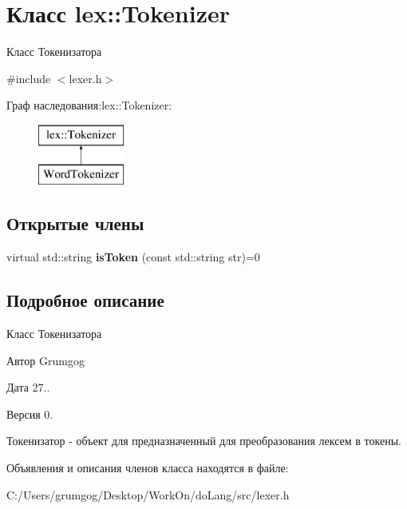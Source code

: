 \hypertarget{classlex_1_1_tokenizer}{}\section{Класс lex\+:\+:Tokenizer}
\label{classlex_1_1_tokenizer}


Класс Токенизатора  




{\ttfamily \#include $<$lexer.\+h$>$}

Граф наследования\+:lex\+:\+:Tokenizer\+:\begin{figure}[H]
\begin{center}
\leavevmode
\includegraphics[height=2.000000cm]{classlex_1_1_tokenizer}
\end{center}
\end{figure}
\subsection*{Открытые члены}
\begin{DoxyCompactItemize}
\item 
\mbox{\label{classlex_1_1_tokenizer_ae074fb2d8d0a4cfc11661c67faad1602}} 
virtual std\+::string {\bfseries is\+Token} (const std\+::string str)=0
\end{DoxyCompactItemize}


\subsection{Подробное описание}
Класс Токенизатора 

\begin{DoxyAuthor}{Автор}
Grumgog 
\end{DoxyAuthor}
\begin{DoxyDate}{Дата}
27.. 
\end{DoxyDate}
\begin{DoxyVersion}{Версия}
0.
\end{DoxyVersion}
Токенизатор -\/ объект для предназначенный для преобразования лексем в токены. 

Объявления и описания членов класса находятся в файле\+:\begin{DoxyCompactItemize}
\item 
C\+:/\+Users/grumgog/\+Desktop/\+Work\+On/do\+Lang/src/lexer.\+h\end{DoxyCompactItemize}
